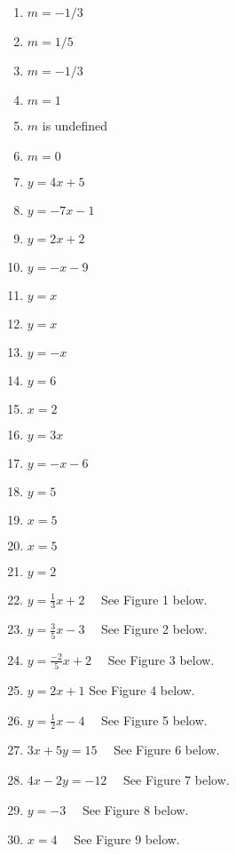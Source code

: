 \documentclass[a4paper]{JAC2003}
\begin{document}
\begin{enumerate}
\item $m=-1 / 3$

\item $m=1 / 5$

\item $m=-1 / 3$

\item $m=1$

\item $m$ is undefined

\item $m=0$

\item $y=4 x+5$

\item $y=-7 x-1$

\item $y=2 x+2$

\item $y=-x-9$

\item $y=x$

\item $y=x$

\item $y=-x$

\item $y=6$

\item $x=2$

\item $y=3 x$

\item $y=-x-6$

\item $y=5$

\item $x=5$

\item $x=5$

\item $y=2$

\item $y=\frac{1}{3} x+2 \quad$ See Figure 1 below.

\item $y=\frac{3}{5} x-3 \quad$ See Figure 2 below.

\item $y=\frac{-2}{5} x+2 \quad$ See Figure 3 below. %

\item $y=2 x+1$ See Figure 4 below.

\item $y=\frac{1}{2} x-4 \quad$ See Figure 5 below.

\item $3 x+5 y=15 \quad$ See Figure 6 below.

\item $4 x-2 y=-12 \quad$ See Figure 7 below.

\item $y=-3 \quad$ See Figure 8 below.

\item $x=4 \quad$ See Figure 9 below.
\end{enumerate}
\end{document}
